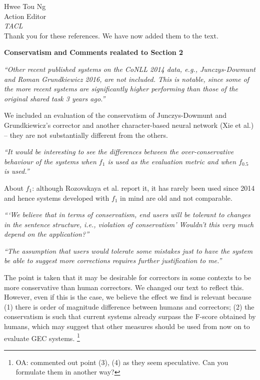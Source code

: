 \documentclass[11pt,letterpaper]{letter}
\newcommand{\oa}[1]{\footnote{\color{red}OA: #1}}
\begin{document}
\begin{letter}{%
Hwee Tou Ng\\
Action Editor\\
{\em TACL}\\
}
Thank you for these references. We have now added them to the text.
	
{\large\bf Conservatism and Comments realated to Section 2}

\emph{``Other recent published systems on the CoNLL 2014 data, e.g., Junczys-Dowmunt
	and Roman Grundkiewicz 2016, are not included. This is notable, since some
	of the more recent systems are significantly higher performing than those of
	the original shared task 3 years ago.''}
	
We included an evaluation of the conservatism of Junczys-Dowmunt and Grundkiewicz's corrector  and another character-based neural network (Xie et al.) -- they are not substantially different from the others.

\emph{``It would be interesting to see the differences between the over-conservative
	behaviour of the systems when $f_1$ is used as the evaluation metric and when
	$f_{0.5}$ is used.''}

About $f_1$: although Rozovskaya et al. report it, it has rarely been used since 2014 and hence systems developed with $f_1$ in mind are old and not comparable.
	
\emph{```We believe that in terms of conservatism, end users will be tolerant to
	changes in the sentence structure, i.e., violation of conservatism' Wouldn't
	this very much depend on the application?''
}

\emph{``The assumption that users would tolerate
	some mistakes just to have the system be able to suggest more corrections
	requires further justification to me.''
}
	
The point is taken that it may be desirable for correctors in some contexts to be more conservative than human correctors. We changed our text to reflect this. However, even if this is the case, we believe the effect we find is relevant because (1) there is order of magnitude difference between humans and correctors; (2) the conservatism is such that current systems already surpass the F-score obtained by humans, which may suggest that other measures should be used from now on to evaluate GEC systems.
\oa{commented out point (3), (4) as they seem speculative. Can you formulate them in another way?}


\end{letter}
\end{document}
